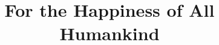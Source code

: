 \documentclass[11pt]{article}
\begin{document}
\ttfamily
\title{For the Happiness of All Humankind}
\maketitle
\end{document}
